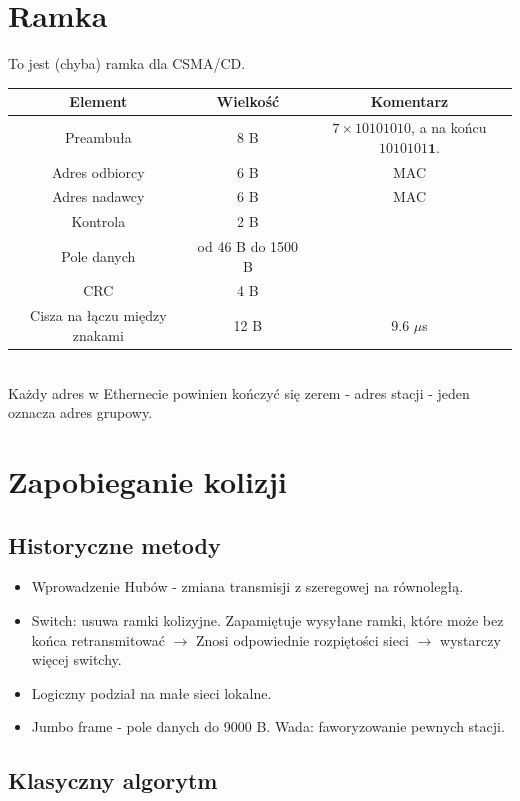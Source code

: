 \documentclass[a4paper,twoside]{article}
\begin{document}
\section{Ramka}
	To jest (chyba) ramka dla CSMA/CD.\\
	\begin{table}[h]
		\begin{tabular}{|c|c|c|}
			\hline
			\textbf{Element} & Wielkość & \textbf{Komentarz} \\ \hline
			\multicolumn{1}{|c|}{Preambuła} 	& 8 B & $ 7\times 10101010$, a na końcu $ 1010101\textbf{1} $. \\ \hline
			\multicolumn{1}{|c|}{Adres odbiorcy}	& 6 B &	MAC \\ \hline
			\multicolumn{1}{|c|}{Adres nadawcy}	& 6 B &	MAC \\ \hline
			\multicolumn{1}{|c|}{Kontrola}		& 2 B & 	\\ \hline
			\multicolumn{1}{|c|}{Pole danych}	& od 46 B do 1500 B	& \\ \hline
			\multicolumn{1}{|c|}{CRC}			& 4 B & \\ \hline
			Cisza na łączu między znakami		& 12 B & 9.6 $ \mu $s \\ \hline
		\end{tabular}
	\end{table}\\
	Każdy adres w Ethernecie powinien kończyć się zerem - adres stacji - jeden oznacza adres grupowy.
\section{Zapobieganie kolizji}
	\subsection{Historyczne metody}
		\begin{itemize}
			\item Wprowadzenie Hubów - zmiana transmisji z szeregowej na równoległą.
			\item Switch: usuwa ramki kolizyjne. Zapamiętuje wysyłane ramki, które może bez końca retransmitować $ \rightarrow $ Znosi odpowiednie rozpiętości sieci $ \rightarrow $ wystarczy więcej switchy.
			\item Logiczny podział na małe sieci lokalne.
			\item Jumbo frame - pole danych do 9000 B. Wada: faworyzowanie pewnych stacji.
		\end{itemize}
	\subsection{Klasyczny algorytm}
\end{document}
